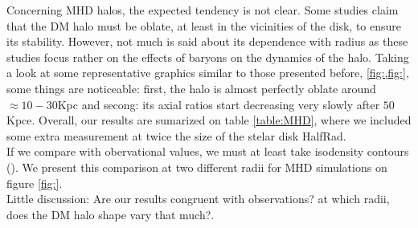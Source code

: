 \documentclass[a4paper,fleqn,usenatbib]{mnras}
\begin{document}
Concerning MHD halos, the expected tendency is not clear. Some studies claim that the DM halo must be oblate, at least in the vicinities of the disk, to ensure its stability. However, not much is said about its dependence with radius as these studies focus rather on the effects of baryons on the dynamics of the halo. Taking a look at some representative graphics similar to those presented before, \ref{fig:,fig:}, some things are noticeable: first, the halo is almost perfectly oblate around $\approx 10-30$Kpc and secong: its axial ratios start decreasing very slowly after $50$Kpce. Overall, our results are sumarized on table \ref{table:MHD}, where we included some extra measurement at twice the size of the stelar disk HalfRad.\\

If we compare with obervational values, we must at least take isodensity contours (). We present this comparison  at two different radii for MHD simulations on figure \ref{fig:}. \\

Little discussion: Are our results congruent with observations? at which radii, does the DM halo shape vary that much?.\\
\end{document}
